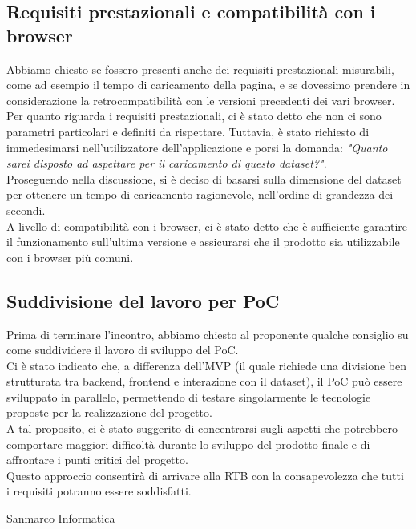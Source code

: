 \subsection{Requisiti prestazionali e compatibilità con i browser}
Abbiamo chiesto se fossero presenti anche dei requisiti prestazionali misurabili, come ad esempio il tempo di caricamento della pagina, e se dovessimo prendere in considerazione la retrocompatibilità con le versioni precedenti dei vari browser.\\
Per quanto riguarda i requisiti prestazionali, ci è stato detto che non ci sono parametri particolari e definiti da rispettare. Tuttavia, è stato richiesto di immedesimarsi nell'utilizzatore dell'applicazione e porsi la domanda: \textit{"Quanto sarei disposto ad aspettare per il caricamento di questo dataset?"}.\\
Proseguendo nella discussione, si è deciso di basarsi sulla dimensione del dataset per ottenere un tempo di caricamento ragionevole, nell'ordine di grandezza dei secondi.\\
A livello di compatibilità con i browser, ci è stato detto che è sufficiente garantire il funzionamento sull'ultima versione e assicurarsi che il prodotto sia utilizzabile con i browser più comuni.\\
\subsection{Suddivisione del lavoro per PoC}
Prima di terminare l'incontro, abbiamo chiesto al proponente qualche consiglio su come suddividere il lavoro di sviluppo del PoC.\\
Ci è stato indicato che, a differenza dell'MVP (il quale richiede una divisione ben strutturata tra backend, frontend e interazione con il dataset), il PoC può essere sviluppato in parallelo, permettendo di testare singolarmente le tecnologie proposte per la realizzazione del progetto.\\
A tal proposito, ci è stato suggerito di concentrarsi sugli aspetti che potrebbero comportare maggiori difficoltà durante lo sviluppo del prodotto finale e di affrontare i punti critici del progetto.\\
Questo approccio consentirà di arrivare alla RTB con la consapevolezza che tutti i requisiti potranno essere soddisfatti.\\


\hfill\signature{Approvazione esterna}{Sanmarco Informatica}
